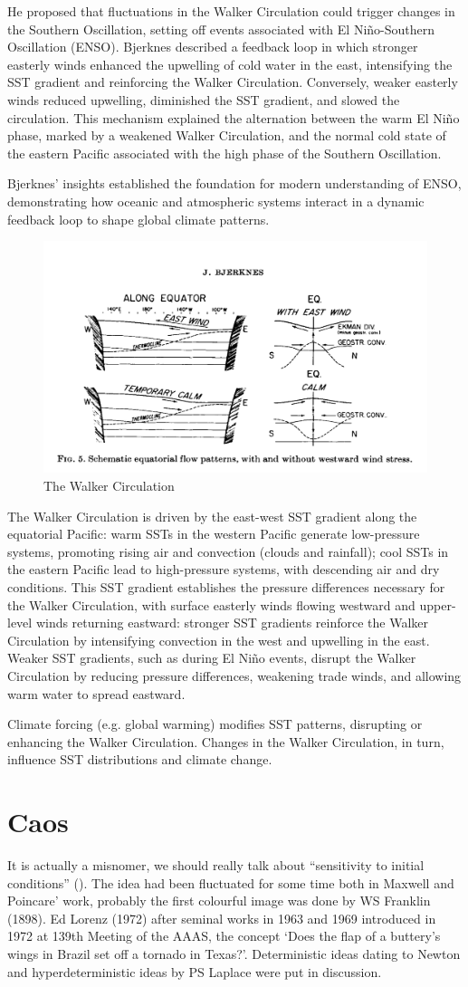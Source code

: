 He proposed that fluctuations in the Walker Circulation could trigger changes in the Southern Oscillation, setting off events associated with El Niño-Southern Oscillation (ENSO). Bjerknes described a feedback loop in which stronger easterly winds enhanced the upwelling of cold water in the east, intensifying the SST gradient and reinforcing the Walker Circulation. Conversely, weaker easterly winds reduced upwelling, diminished the SST gradient, and slowed the circulation. This mechanism explained the alternation between the warm El Niño phase, marked by a weakened Walker Circulation, and the normal cold state of the eastern Pacific associated with the high phase of the Southern Oscillation.

Bjerknes’ insights established the foundation for modern understanding of ENSO, demonstrating how oceanic and atmospheric systems interact in a dynamic feedback loop to shape global climate patterns.
\begin{figure}[htpb]
	\centering
	\includegraphics[width=0.35\linewidth]{uploads/Screenshot 2024-11-24 191635.png}
	\caption{The Walker Circulation}

\end{figure}
The Walker Circulation is driven by the east-west SST gradient along the equatorial Pacific: warm SSTs in the western Pacific generate low-pressure systems, promoting rising air and convection (clouds and rainfall); cool SSTs in the eastern Pacific lead to high-pressure systems, with descending air and dry conditions.
This SST gradient establishes the pressure differences necessary for the Walker Circulation, with surface easterly winds flowing westward and upper-level winds returning eastward: stronger SST gradients reinforce the Walker Circulation by intensifying convection in the west and upwelling in the east. Weaker SST gradients, such as during El Niño events, disrupt the Walker Circulation by reducing pressure differences, weakening trade winds, and allowing warm water to spread eastward.

Climate forcing (e.g. global warming) modifies SST patterns, disrupting or enhancing the Walker Circulation. Changes in the Walker Circulation, in turn, influence SST distributions and climate change.
\section{Caos}
It is actually a misnomer, we should really talk about “sensitivity to initial conditions” (\cite{Tanner2020}).
The idea had been fluctuated for some time both in Maxwell and Poincare’ work, probably the first colourful image was done by WS Franklin (1898). Ed Lorenz (1972) after seminal works in 1963 and 1969 introduced in 1972 at 139th Meeting of the AAAS, the concept ‘Does the flap of a buttery’s wings in Brazil set off a tornado in Texas?’.
Deterministic ideas dating to Newton and hyperdeterministic ideas by PS Laplace were put in discussion.
